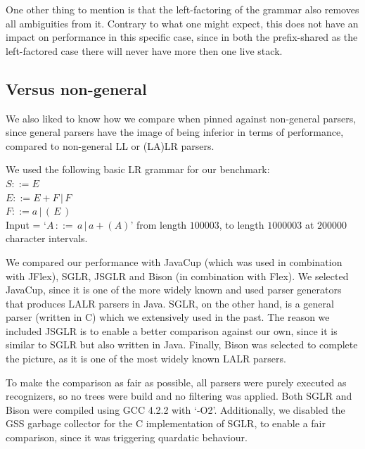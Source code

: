 \documentclass[a4paper,10pt]{article}
\begin{document}
One other thing to mention is that the left-factoring of the grammar also removes all ambiguities from it. Contrary to what one might expect, this does not have an impact on performance in this specific case, since in both the prefix-shared as the left-factored case there will never have more then one live stack.

\subsection{Versus non-general}

We also liked to know how we compare when pinned against non-general parsers, since general parsers have the image of being inferior in terms of performance, compared to non-general LL or (LA)LR parsers.

We used the following basic LR grammar for our benchmark:\\
$S ::= E$\\
$E ::= E + F\,|\,F$\\
$F ::= a\,|\,(\,E\,)$\\
Input = `$A\,::=\,a\,|\,a+(A)$' from length $100003$, to length $1000003$ at $200000$ character intervals.

We compared our performance with JavaCup\cite{javacup} (which was used in combination with JFlex\cite{jflex}), SGLR\cite{sglr}, JSGLR\cite{jsglr} and Bison\cite{bison} (in combination with Flex\cite{flex}). We selected JavaCup, since it is one of the more widely known and used parser generators that produces LALR parsers in Java. SGLR, on the other hand, is a general parser (written in C) which we extensively used in the past. The reason we included JSGLR is to enable a better comparison against our own, since it is similar to SGLR but also written in Java. Finally, Bison was selected to complete the picture, as it is one of the most widely known LALR parsers.

To make the comparison as fair as possible, all parsers were purely executed as recognizers, so no trees were build and no filtering was applied. Both SGLR and Bison were compiled using GCC 4.2.2 with `-O2'. Additionally, we disabled the GSS garbage collector for the C implementation of SGLR, to enable a fair comparison, since it was triggering quardatic behaviour.
\end{document}
